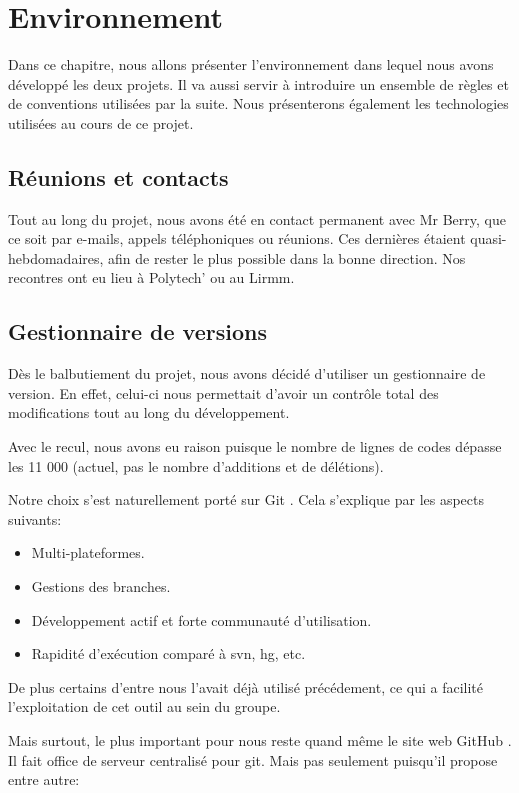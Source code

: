 \chapter{Environnement}

Dans ce chapitre, nous allons présenter l'environnement dans lequel nous avons
développé les deux projets. Il va aussi servir à introduire un ensemble de
règles et de conventions utilisées par la suite.
Nous présenterons également les technologies utilisées au cours de ce projet.

    \section{Réunions et contacts}
Tout au long du projet, nous avons été en contact permanent avec Mr Berry,
que ce soit par e-mails, appels téléphoniques ou réunions. Ces dernières
étaient quasi-hebdomadaires, afin de rester le plus possible dans la
bonne direction. Nos recontres ont eu lieu à Polytech' ou au Lirmm.

    \section{Gestionnaire de versions}
Dès le balbutiement du projet, nous avons décidé d'utiliser un gestionnaire
de version. En effet, celui-ci nous permettait d'avoir un contrôle total des modifications
tout au long du développement.

Avec le recul, nous avons eu raison puisque le nombre de lignes de codes dépasse 
les 11 000 (actuel, pas le nombre d'additions et de délétions).

Notre choix s'est naturellement porté sur Git \cite{git}. Cela s'explique 
par les aspects suivants:

    \begin{itemize}
    \item Multi-plateformes.
    \item Gestions des branches.
    \item Développement actif et forte communauté d'utilisation.
    \item Rapidité d'exécution comparé à svn, hg, etc. 
    \end{itemize}

    De plus certains d'entre nous l'avait déjà utilisé précédement, ce qui a facilité
    l'exploitation de cet outil au sein du groupe.

    Mais surtout, le plus important pour nous reste quand même le site web GitHub \cite{github}.
    Il fait office de serveur centralisé pour git. Mais pas seulement puisqu'il 
    propose entre autre:

